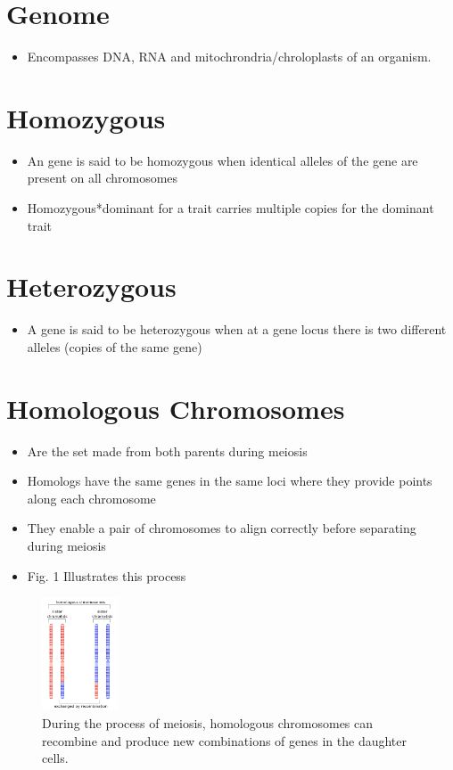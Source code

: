 \documentclass[a4paper]{article}
\begin{document}
\section{Genome}
\label{sec-10}
\begin{itemize}
\item Encompasses DNA, RNA and mitochrondria/chroloplasts of an organism.
\end{itemize}

\section{Homozygous}
\label{sec-11}
\begin{itemize}
\item An gene is said to be homozygous  when identical alleles of the gene are present on all chromosomes
\item Homozygous*dominant for a trait carries multiple copies for the dominant trait
\end{itemize}

\section{Heterozygous}
\label{sec-12}
\begin{itemize}
\item A gene is said to be heterozygous when at a gene locus there is two different alleles (copies of the same gene)
\end{itemize}

\section{Homologous Chromosomes}
\label{sec-13}
\begin{itemize}
\item Are the set made from both parents during meiosis
\item Homologs have the same genes in the same loci where they provide points along each chromosome
\item They enable a pair of chromosomes to align correctly before separating during meiosis
\item Fig. 1 Illustrates this process
\end{itemize}

\begin{figure}[htb]
\centering
\includegraphics[width=0.2\textwidth,height=0.3\textwidth]{./images/meiosis.png}
\caption{\label{fig:Meiosis}During the process of meiosis, homologous chromosomes can recombine and produce new combinations of genes in the daughter cells.}
\end{figure} 
\end{document}
